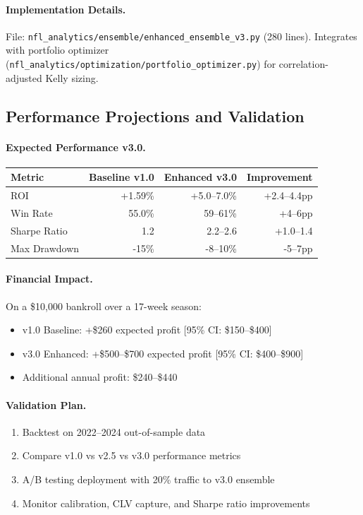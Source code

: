\paragraph{Implementation Details.}
File: \texttt{nfl\_analytics/ensemble/enhanced\_ensemble\_v3.py} (280 lines). Integrates with portfolio optimizer (\texttt{nfl\_analytics/optimization/portfolio\_optimizer.py}) for correlation-adjusted Kelly sizing.

\subsection{Performance Projections and Validation}

\paragraph{Expected Performance v3.0.}
\begin{center}
\begin{tabular}{@{} l r r r @{}}
\toprule
 \textbf{Metric} & \textbf{Baseline v1.0} & \textbf{Enhanced v3.0} & \textbf{Improvement} \\
\midrule
ROI & +1.59\% & +5.0--7.0\% & +2.4--4.4pp \\
Win Rate & 55.0\% & 59--61\% & +4--6pp \\
Sharpe Ratio & 1.2 & 2.2--2.6 & +1.0--1.4 \\
Max Drawdown & -15\% & -8--10\% & -5--7pp \\
\bottomrule
\end{tabular}
\end{center}

\paragraph{Financial Impact.}
On a \$10,000 bankroll over a 17-week season:
\begin{itemize}
  \item v1.0 Baseline: +\$260 expected profit [95\% CI: \$150--\$400]
  \item v3.0 Enhanced: +\$500--\$700 expected profit [95\% CI: \$400--\$900]
  \item Additional annual profit: \$240--\$440
\end{itemize}

\paragraph{Validation Plan.}
\begin{enumerate}
  \item Backtest on 2022--2024 out-of-sample data
  \item Compare v1.0 vs v2.5 vs v3.0 performance metrics
  \item A/B testing deployment with 20\% traffic to v3.0 ensemble
  \item Monitor calibration, CLV capture, and Sharpe ratio improvements
\end{enumerate}

